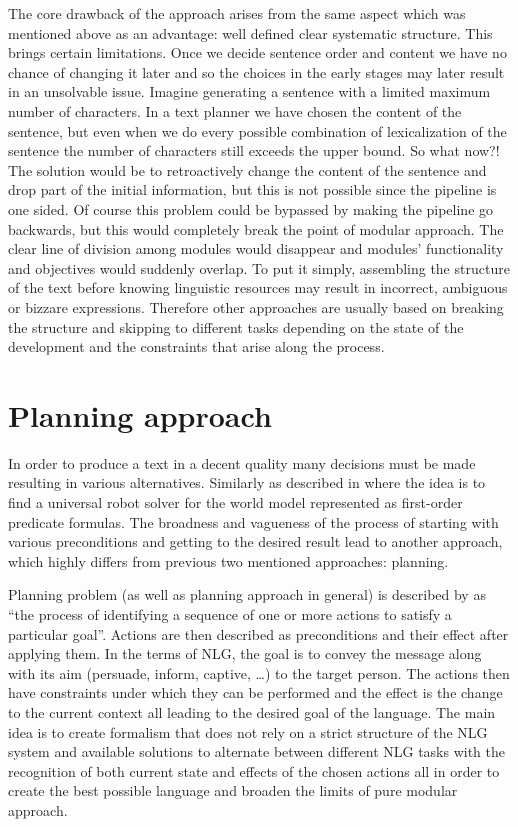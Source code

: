 The core drawback of the approach arises from the same aspect which was mentioned above as an advantage: well defined clear systematic structure. This brings certain limitations. Once we decide sentence order and content we have no chance of changing it later and so the choices in the early stages may later result in an unsolvable issue. Imagine generating a sentence with a limited maximum number of characters. In a text planner we have chosen the content of the sentence, but even when we do every possible combination of lexicalization of the sentence the number of characters still exceeds the upper bound. So what now?! The solution would be to retroactively change the content of the sentence and drop part of the initial information, but this is not possible since the pipeline is one sided. Of course this problem could be bypassed by making the pipeline go backwards, but this would completely break the point of modular approach. The clear line of division among modules would disappear and modules' functionality and objectives would suddenly overlap. To put it simply, assembling the structure of the text before knowing linguistic resources may result in incorrect, ambiguous or bizzare expressions. Therefore other approaches are usually based on breaking the structure and skipping to different tasks depending on the state of the development and the constraints that arise along the process.


\section{Planning approach}
In order to produce a text in a decent quality many decisions must be made resulting in various alternatives. Similarly as described in \cite{fikes1971strips} where the idea is to find a universal robot solver for the world model represented as first-order predicate formulas. The broadness and vagueness of the process of starting with various preconditions and getting to the desired result lead to another approach, which highly differs from previous two mentioned approaches: planning.

Planning problem (as well as planning approach in general) is described by \cite{gatt2018survey} as “the process of identifying a sequence of one or more actions to satisfy a particular goal”. Actions are then described as preconditions and their effect after applying them. In the terms of NLG, the goal is to convey the message along with its aim (persuade, inform, captive, …) to the target person. The actions then have constraints under which they can be performed and the effect is the change to the current context all leading to the desired goal of the language. The main idea is to create formalism that does not rely on a strict structure of the NLG system and available solutions to alternate between different NLG tasks with the recognition of both current state and effects of the chosen actions all in order to create the best possible language and broaden the limits of pure modular approach. 


